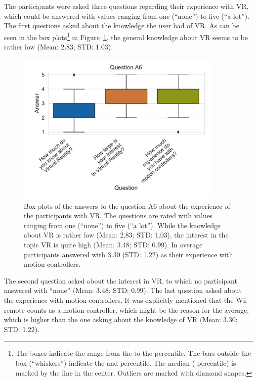The participants were asked three questions regarding their experience with \gls{VR}, which could be answered with values ranging from one (\enquote{none}) to five (\enquote{a lot}). The first questions asked about the knowledge the user had of \gls{VR}. As can be seen in the box plots\footnote{The boxes indicate the range from the  to the  percentile. The bars outside the box (\enquote{whiskers}) indicate the  and  percentile. The median ( percentile) is marked by the line in the center. Outliers are marked with diamond shapes.} in Figure~\ref{fig:res-demo-q9}, the general knowledge about \gls{VR} seems to be rather low (Mean: 2.83; \gls{STD}: 1.03).

\begin{figure}[H]
	\centering
	\includegraphics[width=10cm]{figures/evaluation/res_demo_q9.pdf}
	\caption[VR experience of the participants]{Box plots of the answers to the question A6 about the experience of the participants with \gls{VR}. The questions are rated with values ranging from one (\enquote{none}) to five (\enquote{a lot}). While the knowledge about \gls{VR} is rather low (Mean: 2.83; \gls{STD}: 1.03), the interest in the topic \gls{VR} is quite high (Mean: 3.48; \gls{STD}: 0.99). In average participants answered with 3.30 (\gls{STD}: 1.22) as their experience with motion controllers.}\label{fig:res-demo-q9}
\end{figure}

The second question asked about the interest in \gls{VR}, to which no participant answered with \enquote{none} (Mean: 3.48; \gls{STD}: 0.99). The last question asked about the experience with motion controllers. It was explicitly mentioned that the Wii remote counts as a motion controller, which might be the reason for the average, which is higher than the one asking about the knowledge of \gls{VR} (Mean: 3.30; \gls{STD}: 1.22).


